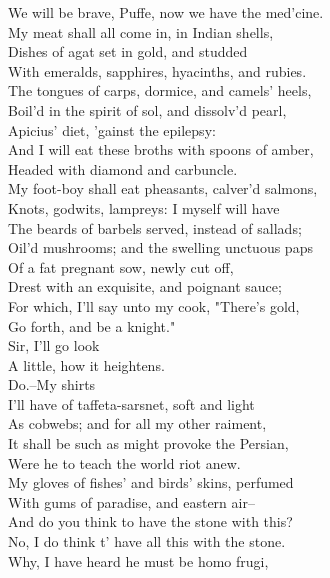 \documentclass{memoir}
\begin{document}
\begin{drama*}
 We will be brave, Puffe, now we have the med'cine.\\
 My meat shall all come in, in Indian shells,\\
 Dishes of agat set in gold, and studded\\
 With emeralds, sapphires, hyacinths, and rubies.\\
 The tongues of carps, dormice, and camels' heels,\\
 Boil'd in the spirit of sol, and dissolv'd pearl,\\
 Apicius' diet, 'gainst the epilepsy:\\
 And I will eat these broths with spoons of amber,\\
 Headed with diamond and carbuncle.\\
 My foot-boy shall eat pheasants, calver'd salmons,\\
 Knots, godwits, lampreys: I myself will have\\
 The beards of barbels served, instead of sallads;\\
 Oil'd mushrooms; and the swelling unctuous paps\\
 Of a fat pregnant sow, newly cut off,\\
 Drest with an exquisite, and poignant sauce;\\
 For which, I'll say unto my cook, "There's gold,\\
 Go forth, and be a knight."\\
\facespeaks {} Sir, I'll go look\\
 A little, how it heightens.\\
\mammonspeaks {} Do.--My shirts\\
 I'll have of taffeta-sarsnet, soft and light\\
 As cobwebs; and for all my other raiment,\\
 It shall be such as might provoke the Persian,\\
 Were he to teach the world riot anew.\\
 My gloves of fishes' and birds' skins, perfumed\\
 With gums of paradise, and eastern air--\\
\surlyspeaks  And do you think to have the stone with this?\\
\mammonspeaks  No, I do think t' have all this with the stone.\\
\surlyspeaks  Why, I have heard he must be homo frugi,\\

\end{drama*}
\end{document}
